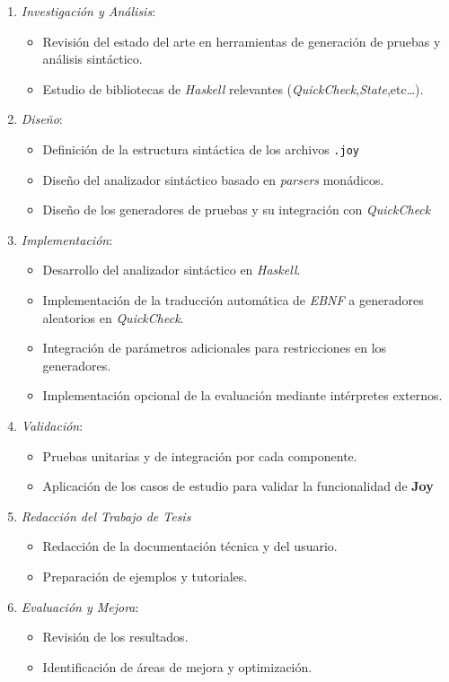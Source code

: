 \documentclass[12pt]{article}
\begin{document}
\begin{enumerate}
\item \textit{Investigación y Análisis}:

  \begin{itemize}
  \item Revisión del estado del arte en herramientas de generación de pruebas y análisis sintáctico.
  \item Estudio de bibliotecas de \textit{Haskell} relevantes (\textit{QuickCheck},\textit{State},etc\ldots).
  \end{itemize}
\item \textit{Diseño}:

  \begin{itemize}
  \item Definición de la estructura sintáctica de los archivos \texttt{.joy}
  \item Diseño del analizador sintáctico basado en \textit{parsers} monádicos.
  \item Diseño de los generadores de pruebas y su integración con \textit{QuickCheck}
  \end{itemize}
\item \textit{Implementación}:

  \begin{itemize}
  \item Desarrollo del analizador sintáctico en \textit{Haskell}.
  \item Implementación de la traducción automática de \textit{EBNF} a generadores aleatorios en \textit{QuickCheck}.
  \item Integración de parámetros adicionales para restricciones en los generadores.
  \item Implementación opcional de la evaluación mediante intérpretes externos.
  \end{itemize}
\item \textit{Validación}:

  \begin{itemize}
  \item Pruebas unitarias y de integración por cada componente.
  \item Aplicación de los casos de estudio para validar la funcionalidad de \textbf{Joy}
  \end{itemize}
\item \textit{Redacción del Trabajo de Tesis}
  
  \begin{itemize}
  \item Redacción de la documentación técnica y del usuario.
  \item Preparación de ejemplos y tutoriales.
  \end{itemize}

\item \textit{Evaluación y Mejora}:

  \begin{itemize}
  \item Revisión de los resultados.
  \item Identificación de áreas de mejora y optimización.
  \end{itemize}
\end{enumerate}
\end{document}
